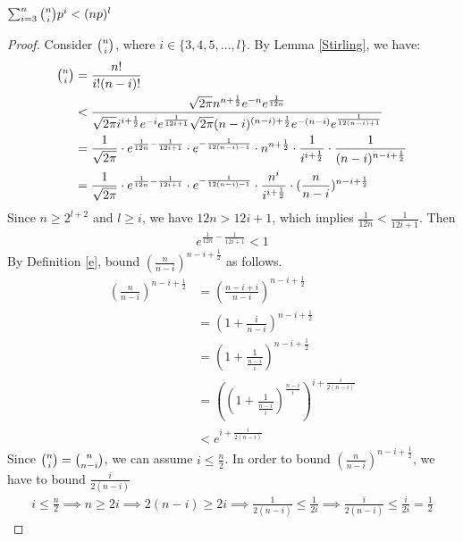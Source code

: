 \begin{claim}
$\sum_{i=3}^{n}\tbinom{n}{i}p^i<(np)^l$
\end{claim}
\begin{proof}
Consider $\tbinom{n}{i}$, where $i\in\{3,4,5,...,l\}$. By Lemma \ref{Stirling}, we have:
\begin{align}
   \nonumber\tbinom{n}{i}&=\frac{n!}{i!(n-i)!}\\
    \nonumber&< \frac{\sqrt{2\pi}n^{n+\frac{1}{2}}e^{-n}e^{\frac{1}{12n}}}{\sqrt{2\pi}i^{i+\frac{1}{2}}e^{-i}e^{\frac{1}{12i+1}}\sqrt{2\pi}(n-i)^{(n-i)+\frac{1}{2}}e^{-(n-i)}e^{\frac{1}{12(n-i)+1}}}\\
    \nonumber &=\frac{1}{\sqrt{2\pi}}\cdot e^{\frac{1}{12n}-\frac{1}{12i+1}}\cdot e^{-\frac{1}{12(n-i)-1}} \cdot n^{n+\frac{1}{2}} \cdot \frac{1}{i^{i+\frac{1}{2}}} \cdot \frac{1}{(n-i)^{n-i+\frac{1}{2}}}\\
    &=\frac{1}{\sqrt{2\pi}}\cdot e^{\frac{1}{12n}-\frac{1}{12i+1}}\cdot e^{-\frac{1}{12(n-i)-1}} \cdot \frac{n^i}{i^{i+\frac{1}{2}}} \cdot (\frac{n}{n-i})^{n-i+\frac{1}{2}}\label{a}
\end{align}
Since $n\ge 2^{l+2}$ and $l\ge i$, we have $12n > 12i+1$, which implies $\frac{1}{12n} < \frac{1}{12i+1}$. Then
\begin{align}
     e^{\frac{1}{12n}-\frac{1}{12i+1}} < 1 \label{b}
\end{align}
By Definition \ref{e}, bound $(\frac{n}{n-i})^{n-i+\frac{1}{2}}$ as follows.
\begin{align}
    \nonumber (\frac{n}{n-i})^{n-i+\frac{1}{2}}
    &= (\frac{n-i+i}{n-i})^{n-i+\frac{1}{2}}\\
    \nonumber&= (1+\frac{i}{n-i})^{n-i+\frac{1}{2}}\\
    \nonumber&= (1+\frac{1}{\frac{n-i}{i}})^{n-i+\frac{1}{2}}\\
    \nonumber&= ((1+\frac{1}{\frac{n-i}{i}})^{\frac{n-i}{i}})^{i+\frac{i}{2(n-i)}}\\
    \nonumber &< e^{i+\frac{i}{2(n-i)}}
\end{align}
Since $\tbinom{n}{i}=\tbinom{n}{n-i}$, 
we can assume $i\le \frac{n}{2}$. 
In order to bound $(\frac{n}{n-i})^{n-i+\frac{1}{2}}$, we have to bound $\frac{i}{2(n-i)}$
\begin{align}
   \nonumber i\le \frac{n}{2} 
   \implies n \ge 2i 
   \implies 2(n-i) \ge 2i \implies \frac{1}{2(n-i)} \le \frac{1}{2i} \implies  \frac{i}{2(n-i)} \le \frac{i}{2i} =\frac{1}{2}
\end{align}

\end{proof}
